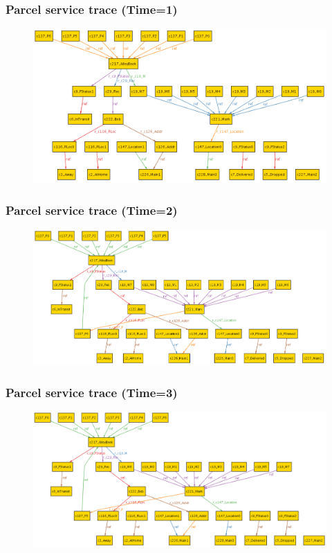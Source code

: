 \documentclass[xcolor=dvipsnames,mathserif,12pt,backend=biber]{beamer}
\begin{document}
  \begin{frame}
    \frametitle{Parcel service trace (Time=1)}
\begin{figure}
\includegraphics[width=1.1 \textwidth]{Figures/Shipping_Time1.png}
\end{figure}
  \end{frame}
  \begin{frame}
    \frametitle{Parcel service trace (Time=2)}
\begin{figure}
\includegraphics[width=1.1 \textwidth]{Figures/Shipping_Time2.png}
\end{figure}
  \end{frame}
  \begin{frame}
    \frametitle{Parcel service trace (Time=3)}
\begin{figure}
\includegraphics[width=1.1 \textwidth]{Figures/Shipping_Time3.png}
\end{figure}
  \end{frame}
\end{document}
